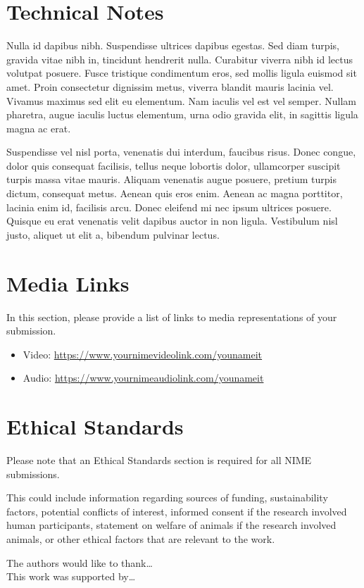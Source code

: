 \documentclass[acmsmall]{nimeart}
\begin{document}
\section{Technical Notes}

Nulla id dapibus nibh. Suspendisse ultrices dapibus egestas. Sed diam turpis, gravida vitae nibh in, tincidunt hendrerit nulla. Curabitur viverra nibh id lectus volutpat posuere. Fusce tristique condimentum eros, sed mollis ligula euismod sit amet. Proin consectetur dignissim metus, viverra blandit mauris lacinia vel. Vivamus maximus sed elit eu elementum. Nam iaculis vel est vel semper. Nullam pharetra, augue iaculis luctus elementum, urna odio gravida elit, in sagittis ligula magna ac erat.

Suspendisse vel nisl porta, venenatis dui interdum, faucibus risus. Donec congue, dolor quis consequat facilisis, tellus neque lobortis dolor, ullamcorper suscipit turpis massa vitae mauris. Aliquam venenatis augue posuere, pretium turpis dictum, consequat metus. Aenean quis eros enim. Aenean ac magna porttitor, lacinia enim id, facilisis arcu. Donec eleifend mi nec ipsum ultrices posuere. Quisque eu erat venenatis velit dapibus auctor in non ligula. Vestibulum nisl justo, aliquet ut elit a, bibendum pulvinar lectus.

\section{Media Links}

In this section, please provide a list of links to media representations of your submission.

\begin{itemize}
	\item Video: \url{https://www.yournimevideolink.com/younameit}
	\item Audio: \url{https://www.yournimeaudiolink.com/younameit}
\end{itemize}

\section{Ethical Standards}

Please note that an Ethical Standards section is required for all NIME submissions.

This could include information regarding sources of funding, sustainability factors, potential conflicts of interest,  informed consent if the research involved human participants, statement on welfare of animals if the research involved animals, or other ethical factors that are relevant to the work.

\begin{acks}
The authors would like to thank\ldots
\\
This work was supported by\ldots
\end{acks}



\end{document}
